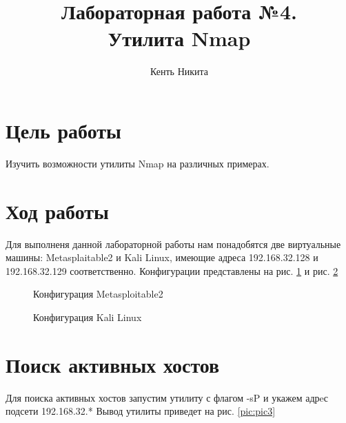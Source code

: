 \documentclass[10pt,a4paper]{report}
\author{Кенть Никита}
\title{Лабораторная работа №4.\\
	Утилита Nmap}
\begin{document}
	\maketitle
	\tableofcontents
	\pagebreak
	
\section{Цель работы}
	Изучить возможности утилиты Nmap на различных примерах.
\section{Ход работы}
	Для выполненя данной лабораторной работы нам понадобятся две виртуальные машины: Metasplaitable2 и Kali Linux, имеющие адреса 192.168.32.128 и 192.168.32.129 соответственно. Конфигурации представлены на рис. \ref{pic:pic1} и рис. \ref{pic:pic2}
	
\begin{figure}[ht]	
	\caption{Конфигурация Metasploitable2}
	\label{pic:pic1}
\end{figure} 


\begin{figure}[ht]	
	\caption{Конфигурация Kali Linux}
	\label{pic:pic2}
\end{figure} 
\section{Поиск активных хостов}
Для поиска активных хостов запустим утилиту с флагом -sP и укажем адрeс подсети 192.168.32.*  Вывод утилиты приведет на рис.  \ref{pic:pic3}
\end{document}
